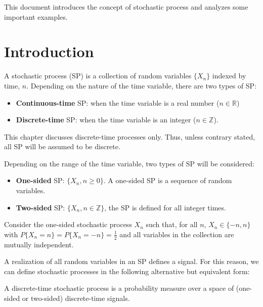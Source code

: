 
This document introduces the concept of stochastic process and analyzes some important examples.

\vspace{1.5cm}

\section{Introduction}

A stochastic process (SP) is a collection of random variables $\{X_n\}$ indexed by time, $n$. Depending on the nature of the time variable, there are two types of SP:
\begin{itemize}
\item \textbf{Continuous-time} SP: when the time variable is a real number ($n \in \mathbb{R}$)
\item \textbf{Discrete-time} SP: when the time variable is an integer ($n \in \mathbb{Z}$).
\end{itemize}

This chapter discusses discrete-time processes only. Thus, unless contrary stated, all SP will be assumed to be discrete.

Depending on the range of the time variable, two types of SP will be considered:
\begin{itemize}
\item \textbf{One-sided} SP: $\{X_n, n \ge 0\}$. A one-sided SP is a sequence of random variables.
\item \textbf{Two-sided} SP: $\{X_n, n\in \mathbb{Z}\}$, the SP is defined for all integer times.
\end{itemize}

\begin{example}

Consider the one-sided stochastic process $X_n$ such that, for all $n$, $X_n \in \{-n, n\}$ with $P\{X_n=n\}=P\{X_n=-n\}=\frac12$ and all variables in the collection are mutually independent.

\end{example}

A realization of all random variables in an SP defines a signal. For this reason, we can define stochastic processes in the following alternative but equivalent form:

\begin{definition}

A discrete-time stochastic process is a probability measure over a space of (one-sided or two-sided) discrete-time signals.

\end{definition}

